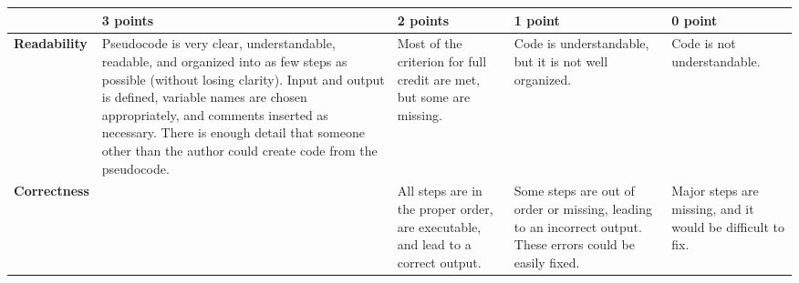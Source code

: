 \documentclass[12pt,landscape]{article}
\begin{document}
{\renewcommand{\arraystretch}{2}
\begin{tabular}{|p{2.3cm}|p{6cm}|p{4.2cm}|p{4.2cm}|p{4.2cm}|}
\hline
& {\bf 3 points} & {\bf 2 points} & {\bf 1 point}& {\bf 0 point} \\
\hline
{\bf Readability }& 
 Pseudocode is very clear, understandable, readable, and organized into as few steps as possible (without losing clarity). Input and output is defined, variable names are chosen appropriately, and comments inserted as necessary. There is enough detail that someone other than the author could create code from the pseudocode.& 
 Most of the criterion for full credit are met, but some are missing. & Code is understandable, but it is not well organized. & 
 Code is not understandable.\\
\hline
{\bf Correctness }& 
&All steps are in the proper order, are executable, and lead to a correct output.& Some steps are out of order or missing, leading to an incorrect output. These errors could be easily fixed. & 
Major steps are missing, and it would be difficult to fix.\\
\hline

 \end{tabular}
}
\end{document}
